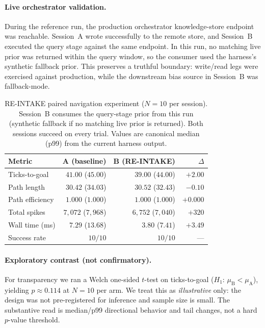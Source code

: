 \documentclass[sigchi-a]{acmart}
\providecommand{\measuredFrom}[1]{}
\begin{document}
\paragraph{Live orchestrator validation.}
During the reference run, the production orchestrator knowledge-store
endpoint was reachable. Session~A wrote successfully to the remote store,
and Session~B executed the query stage against the same endpoint. In this
run, no matching live prior was returned within the query window, so the
consumer used the harness's synthetic fallback prior. This preserves a
truthful boundary: write/read legs were exercised against production, while
the downstream bias source in Session~B was fallback-mode.

\begin{table}[t]
\centering
\caption{RE-INTAKE paired navigation experiment ($N=10$ per session).
Session~B consumes the query-stage prior from this run (synthetic fallback
if no matching live prior is returned). Both sessions succeed on every
trial. Values are canonical median (p99) from the current harness output.}
\label{tab:reintake-results}
\small
\measuredFrom{HoloScript/packages/engine/src/simulation/__tests__/paper-reintake-compounding.test.ts}%
\begin{tabular}{lrrr}
\toprule
\textbf{Metric} & \textbf{A (baseline)} & \textbf{B (RE-INTAKE)} & $\Delta$ \\
\midrule
Ticks-to-goal    & $41.00$ ($45.00$)     & $39.00$ ($44.00$)     & $+2.00$ \\
Path length      & $30.42$ ($34.03$)     & $30.52$ ($32.43$)     & $-0.10$ \\
Path efficiency  & $1.000$ ($1.000$)     & $1.000$ ($1.000$)     & $+0.000$ \\
Total spikes     & $7{,}072$ ($7{,}968$) & $6{,}752$ ($7{,}040$) & $+320$  \\
Wall time (ms)   & $7.29$ ($13.68$)      & $3.80$ ($7.41$)       & $+3.49$ \\
Success rate     & $10/10$           & $10/10$           & ---     \\
\bottomrule
\end{tabular}
\end{table}

\paragraph{Exploratory contrast (not confirmatory).}
For transparency we ran a Welch one-sided $t$-test on ticks-to-goal
($H_1$: $\mu_{\text{B}} < \mu_{\text{A}}$), yielding $p \approx 0.114$
at $N{=}10$ per arm. We treat this as \emph{illustrative} only: the
design was not pre-registered for inference and sample size is small.
The substantive read is median/p99 directional behavior and tail changes,
not a hard $p$-value threshold.
\end{document}
